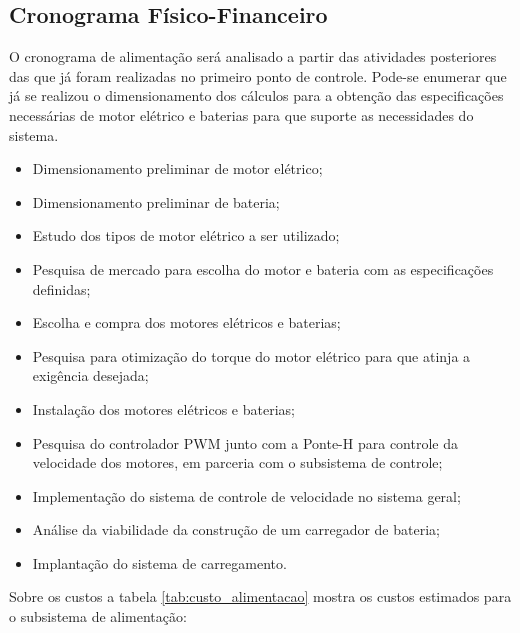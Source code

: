 \subsection{Cronograma Físico-Financeiro}

O cronograma de alimentação será analisado a partir das atividades posteriores das que já foram realizadas no primeiro ponto de controle. Pode-se enumerar que já se realizou o dimensionamento dos cálculos para a obtenção das especificações necessárias de motor elétrico e baterias para que suporte as necessidades do sistema. 

\begin{itemize}
\item Dimensionamento preliminar de motor elétrico;
\item Dimensionamento preliminar de bateria;
\item Estudo dos tipos de motor elétrico a ser utilizado;
\item Pesquisa de mercado para escolha do motor e bateria com as especificações definidas;
\item Escolha e compra dos motores elétricos e baterias;
\item Pesquisa para otimização do torque do motor elétrico para que atinja a exigência desejada;
\item Instalação dos motores elétricos e baterias;
\item Pesquisa do controlador PWM junto com a Ponte-H para controle da velocidade dos motores, em parceria com o subsistema de controle;
\item Implementação do sistema de controle de velocidade no sistema geral;
\item Análise da viabilidade da construção de um carregador de bateria;
\item Implantação do sistema de carregamento.
\end{itemize}

Sobre os custos a tabela \ref{tab:custo_alimentacao} mostra os custos estimados para o subsistema de alimentação: 

